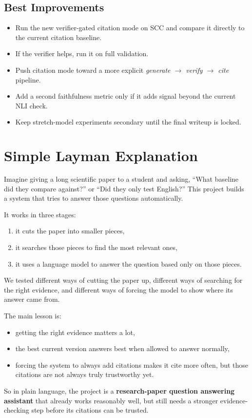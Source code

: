 \documentclass[11pt]{article}
\begin{document}
\subsection{Best Improvements}
\begin{itemize}
  \item Run the new verifier-gated citation mode on SCC and compare it directly to the current citation baseline.
  \item If the verifier helps, run it on full validation.
  \item Push citation mode toward a more explicit \emph{generate $\rightarrow$ verify $\rightarrow$ cite} pipeline.
  \item Add a second faithfulness metric only if it adds signal beyond the current NLI check.
  \item Keep stretch-model experiments secondary until the final writeup is locked.
\end{itemize}

\section{Simple Layman Explanation}
Imagine giving a long scientific paper to a student and asking, ``What baseline did they compare against?'' or ``Did they only test English?'' This project builds a system that tries to answer those questions automatically.

It works in three stages:
\begin{enumerate}
  \item it cuts the paper into smaller pieces,
  \item it searches those pieces to find the most relevant ones,
  \item it uses a language model to answer the question based only on those pieces.
\end{enumerate}

We tested different ways of cutting the paper up, different ways of searching for the right evidence, and different ways of forcing the model to show where its answer came from.

The main lesson is:
\begin{itemize}
  \item getting the right evidence matters a lot,
  \item the best current version answers best when allowed to answer normally,
  \item forcing the system to always add citations makes it cite more often, but those citations are not always truly trustworthy yet.
\end{itemize}

So in plain language, the project is a \textbf{research-paper question answering assistant} that already works reasonably well, but still needs a stronger evidence-checking step before its citations can be trusted.
\end{document}
